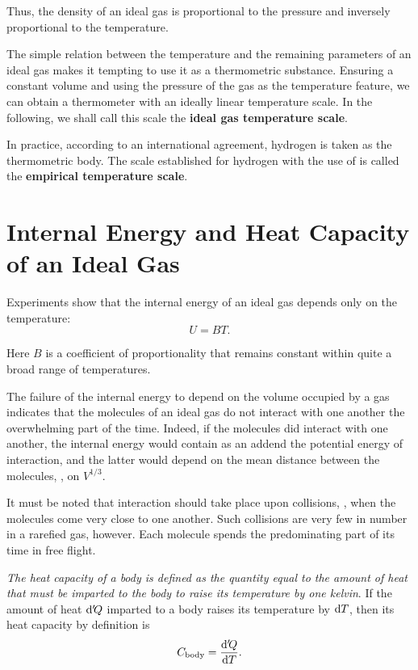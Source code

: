 \noindent
Thus, the density of an ideal gas is proportional to the pressure and inversely proportional to the temperature.

The simple relation between the temperature and the remaining parameters of an ideal gas makes it tempting to use it as a thermometric substance. Ensuring a constant volume and using the pressure of the gas as the temperature feature, we can obtain a thermometer with an ideally linear temperature scale. In the following, we shall call this scale the \textbf{ideal gas temperature scale}.

In practice, according to an international agreement, hydrogen is taken as the thermometric body. The scale established for hydrogen with the use of  is called the \textbf{empirical temperature scale}.

\section{Internal Energy and Heat Capacity of an Ideal Gas}\label{sec:10_9}

Experiments show that the internal energy of an ideal gas depends only on the temperature:
\begin{equation}\label{eq:10_23}
	U = B T.
\end{equation}

\noindent
Here $B$ is a coefficient of proportionality that remains constant within quite a broad range of temperatures.

The failure of the internal energy to depend on the volume occupied by a gas indicates that the molecules of an ideal gas do not interact with one another the overwhelming part of the time. Indeed, if the molecules did interact with one another, the internal energy would contain as an addend the potential energy of interaction, and the latter would depend on the mean distance between the molecules, \ie, on $V^{1/3}$.

It must be noted that interaction should take place upon collisions, \ie, when the molecules come very close to one another. Such collisions are very few in number in a rarefied gas, however. Each molecule spends the predominating part of its time in free flight.

\textit{The heat capacity of a body is defined as the quantity equal to the amount of heat that must be imparted to the body to raise its temperature by one kelvin}. If the amount of heat $\mathrm{d}'\!Q$ imparted to a body raises its temperature by $\mathrm{d} T$, then its heat capacity by definition is
\begin{equation}\label{eq:10_24}
	C_{\text{body}} = \frac{\mathrm{d}'\!Q}{\mathrm{d} T}.
\end{equation}

